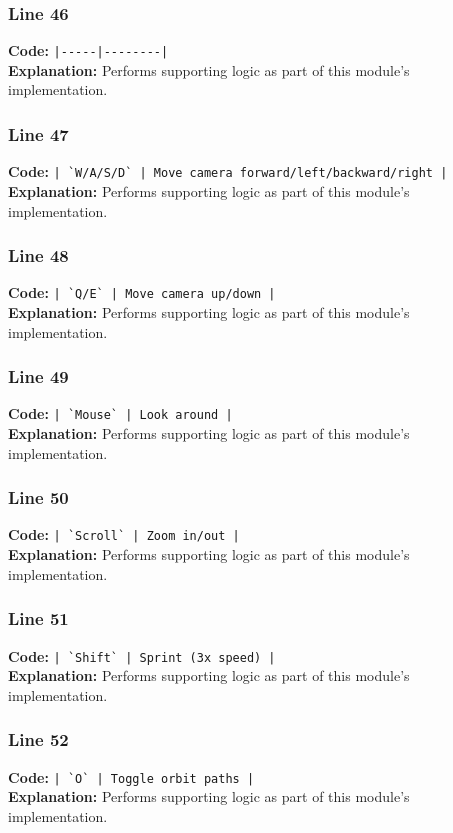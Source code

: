 \documentclass[11pt,a4paper]{article}
\begin{document}
\subsubsection*{Line 46}
\textbf{Code:} \verb!|-----|--------|!\\
\textbf{Explanation:} Performs supporting logic as part of this module's implementation.

\subsubsection*{Line 47}
\textbf{Code:} \verb!| `W/A/S/D` | Move camera forward/left/backward/right |!\\
\textbf{Explanation:} Performs supporting logic as part of this module's implementation.

\subsubsection*{Line 48}
\textbf{Code:} \verb!| `Q/E` | Move camera up/down |!\\
\textbf{Explanation:} Performs supporting logic as part of this module's implementation.

\subsubsection*{Line 49}
\textbf{Code:} \verb!| `Mouse` | Look around |!\\
\textbf{Explanation:} Performs supporting logic as part of this module's implementation.

\subsubsection*{Line 50}
\textbf{Code:} \verb!| `Scroll` | Zoom in/out |!\\
\textbf{Explanation:} Performs supporting logic as part of this module's implementation.

\subsubsection*{Line 51}
\textbf{Code:} \verb!| `Shift` | Sprint (3x speed) |!\\
\textbf{Explanation:} Performs supporting logic as part of this module's implementation.

\subsubsection*{Line 52}
\textbf{Code:} \verb!| `O` | Toggle orbit paths |!\\
\textbf{Explanation:} Performs supporting logic as part of this module's implementation.
\end{document}
